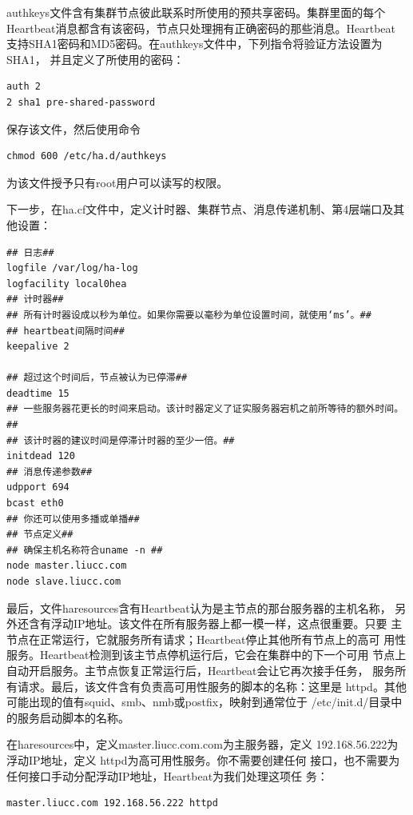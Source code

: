 authkeys文件含有集群节点彼此联系时所使用的预共享密码。集群里面的每个
Heartbeat消息都含有该密码，节点只处理拥有正确密码的那些消息。Heartbeat
支持SHA1密码和MD5密码。在authkeys文件中，下列指令将验证方法设置为SHA1，
并且定义了所使用的密码：

\begin{verbatim}
auth 2
2 sha1 pre-shared-password
\end{verbatim}

保存该文件，然后使用命令

\begin{verbatim}
chmod 600 /etc/ha.d/authkeys
\end{verbatim}

为该文件授予只有root用户可以读写的权限。

下一步，在ha.cf文件中，定义计时器、集群节点、消息传递机制、第4层端口及其他设置：

\begin{verbatim}
## 日志##
logfile /var/log/ha-log
logfacility local0hea
## 计时器##
## 所有计时器设成以秒为单位。如果你需要以毫秒为单位设置时间，就使用‘ms’。##
## heartbeat间隔时间##
keepalive 2

## 超过这个时间后，节点被认为已停滞##
deadtime 15
## 一些服务器花更长的时间来启动。该计时器定义了证实服务器宕机之前所等待的额外时间。##
## 该计时器的建议时间是停滞计时器的至少一倍。##
initdead 120
## 消息传递参数##
udpport 694
bcast eth0
## 你还可以使用多播或单播##
## 节点定义##
## 确保主机名称符合uname -n ##
node master.liucc.com
node slave.liucc.com
\end{verbatim}

最后，文件haresources含有Heartbeat认为是主节点的那台服务器的主机名称，
另外还含有浮动IP地址。该文件在所有服务器上都一模一样，这点很重要。只要
主节点在正常运行，它就服务所有请求；Heartbeat停止其他所有节点上的高可
用性服务。Heartbeat检测到该主节点停机运行后，它会在集群中的下一个可用
节点上自动开启服务。主节点恢复正常运行后，Heartbeat会让它再次接手任务，
服务所有请求。最后，该文件含有负责高可用性服务的脚本的名称：这里是
httpd。其他可能出现的值有squid、smb、nmb或postfix，映射到通常位于
/etc/init.d/目录中的服务启动脚本的名称。

在haresources中，定义master.liucc.com.com为主服务器，定义
192.168.56.222为浮动IP地址，定义 httpd为高可用性服务。你不需要创建任何
接口，也不需要为任何接口手动分配浮动IP地址，Heartbeat为我们处理这项任
务：

\begin{verbatim}
master.liucc.com 192.168.56.222 httpd
\end{verbatim}

